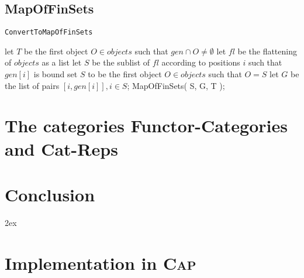 \documentclass{article}
\begin{document}
\subsection{MapOfFinSets}

\begin{algorithm}\capstart
   \caption{\texttt{ConvertToMapOfFinSets}}\label{algo:ConvertToMapOfFinSets}
      \BlankLine
      let $T$ be the first object $O \in objects$ such that $gen \cap O \not= \emptyset$\;
      let $fl$ be the flattening of $objects$ as a list\;
      let $S$ be the sublist of $fl$ according to positions $i$ such that $gen[i]$ is bound\;
      set $S$ to be the first object $O \in objects$ such that $O = S$\;
      \BlankLine
      let $G$ be the list of pairs $[ i, gen[i] ], i \in S$;
      \BlankLine
      \Return MapOfFinSets( S, G, T );
\end{algorithm}

\section{The categories Functor-Categories and Cat-Reps}
\section{Conclusion}


\begingroup
     \parindent 0pt
     \parskip 2ex
     \def\enotesize{\normalsize}
     \theendnotes
\endgroup 



\appendix
\renewcommand{\thesection}{\Alph{section}}
\section{Implementation in \textsc{Cap}}

\end{document}
